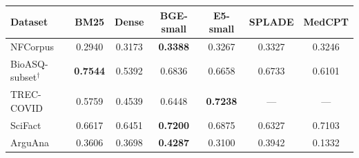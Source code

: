 \begin{tabular}{lSSSSSS}
\toprule
\textbf{Dataset} & \textbf{BM25} & \textbf{Dense} & \textbf{BGE-small} & \textbf{E5-small} & \textbf{SPLADE} & \textbf{MedCPT} \\
\midrule
NFCorpus & 0.2940 & 0.3173 & \textbf{0.3388} & 0.3267 & 0.3327 & 0.3246 \\
BioASQ-subset$^{\dagger}$ & \textbf{0.7544} & 0.5392 & 0.6836 & 0.6658 & 0.6733 & 0.6101 \\
TREC-COVID & 0.5759 & 0.4539 & 0.6448 & \textbf{0.7238} & {---} & {---} \\
SciFact & 0.6617 & 0.6451 & \textbf{0.7200} & 0.6875 & 0.6327 & 0.7103 \\
ArguAna & 0.3606 & 0.3698 & \textbf{0.4287} & 0.3100 & 0.3942 & 0.1332 \\
\bottomrule
\end{tabular}

